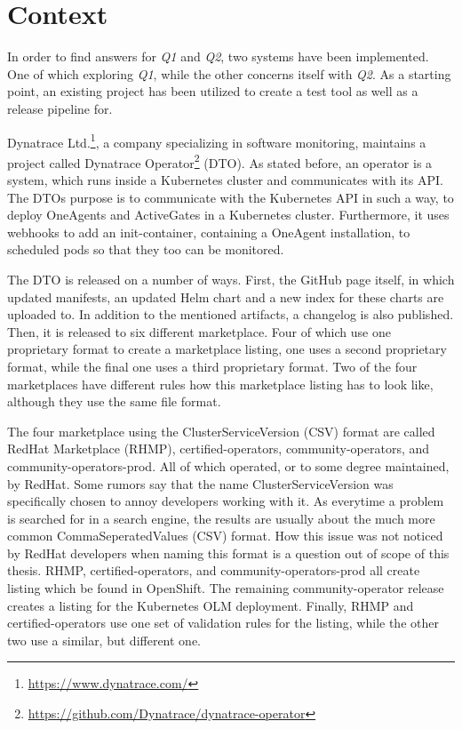 \chapter{Context}\label{ch:context}

In order to find answers for \textit{Q1} and \textit{Q2}, two systems have been implemented.
One of which exploring \textit{Q1}, while the other concerns itself with \textit{Q2}.
As a starting point, an existing project has been utilized to create a test tool as well as a release pipeline for.

Dynatrace Ltd.\footnote{\url{https://www.dynatrace.com/}}, a company specializing in software monitoring, maintains a project called Dynatrace Operator\footnote{\url{https://github.com/Dynatrace/dynatrace-operator}} (DTO).
As stated before, an operator is a system, which runs inside a Kubernetes cluster and communicates with its API.
The DTOs purpose is to communicate with the Kubernetes API in such a way, to deploy OneAgents and ActiveGates in a Kubernetes cluster.
Furthermore, it uses webhooks to add an init-container, containing a OneAgent installation, to scheduled pods so that they too can be monitored.

The DTO is released on a number of ways.
First, the GitHub page itself, in which updated manifests, an updated Helm chart and a new index for these charts are uploaded to.
In addition to the mentioned artifacts, a changelog is also published.
Then, it is released to six different marketplace.
Four of which use one proprietary format to create a marketplace listing, one uses a second proprietary format, while the final one uses a third proprietary format.
Two of the four marketplaces have different rules how this marketplace listing has to look like, although they use the same file format.

The four marketplace using the ClusterServiceVersion (CSV) format are called RedHat Marketplace (RHMP), certified-operators, community-operators, and community-operators-prod.
All of which operated, or to some degree maintained, by RedHat.
Some rumors say that the name ClusterServiceVersion was specifically chosen to annoy developers working with it.
As everytime a problem is searched for in a search engine, the results are usually about the much more common CommaSeperatedValues (CSV) format.
How this issue was not noticed by RedHat developers when naming this format is a question out of scope of this thesis.
RHMP, certified-operators, and community-operators-prod all create listing which be found in OpenShift.
The remaining community-operator release creates a listing for the Kubernetes OLM deployment.
Finally, RHMP and certified-operators use one set of validation rules for the listing, while the other two use a similar, but different one.


